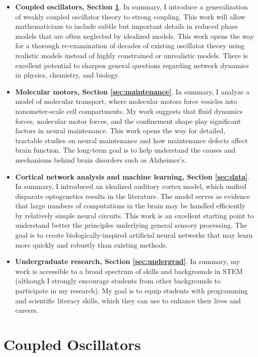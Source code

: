 \documentclass[a4paper,11pt]{article}
\begin{document}
\begin{itemize}
	\item \textbf{Coupled oscillators, Section \ref{sec:interactions}}. In summary, I introduce a generalization of weakly coupled oscillator theory to strong coupling. This work will allow mathematicians to include subtle but important details in reduced phase models that are often neglected by idealized models. This work opens the way for a thorough re-examination of decades of existing oscillator theory using realistic models instead of highly constrained or unrealistic models. There is excellent potential to sharpen general questions regarding network dynamics in physics, chemistry, and biology.
	\item \textbf{Molecular motors, Section \ref{sec:maintenance}}. In summary, I analyze a model of molecular transport, where molecular motors force vesicles into nanometer-scale cell compartments. My work suggests that fluid dynamics forces, molecular motor forces, and the confinement shape play significant factors in neural maintenance. This work opens the way for detailed, tractable studies on neural maintenance and how maintenance defects affect brain function. The long-term goal is to help understand the causes and mechanisms behind brain disorders such as Alzheimer's.
	\item \textbf{Cortical network analysis and machine learning, Section \ref{sec:data}}. In summary, I introduced an idealized auditory cortex model, which unified disparate optogenetics results in the literature. The model serves as evidence that large numbers of computations in the brain may be handled efficiently by relatively simple neural circuits. This work is an excellent starting point to understand better the principles underlying general sensory processing. The goal is to create biologically-inspired artificial neural networks that may learn more quickly and robustly than existing methods.
	\item \textbf{Undergraduate research, Section \ref{sec:undergrad}}. In summary, my work is accessible to a broad spectrum of skills and backgrounds in STEM (although I strongly encourage students from other backgrounds to participate in my research). My goal is to equip students with programming and scientific literacy skills, which they can use to enhance their lives and careers.
\end{itemize}

\section{Coupled Oscillators}\label{sec:interactions}
\end{document}
